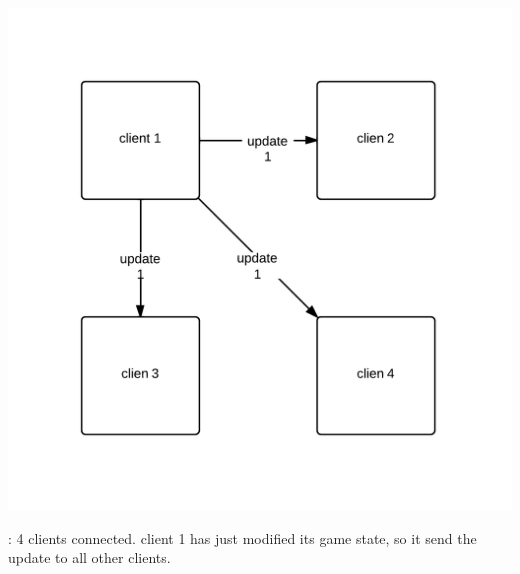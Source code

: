 \begin{marginfigure}
	\includegraphics{res/computer_communication_architecture/ServerClientSynchronizationP2P.png}
	\caption{
	\stepOneName : 4 clients connected. client 1 has just modified its game state, so it send the update to all other clients.
	}
	\label{fig:serverClientSychP2P}
\end{marginfigure}

